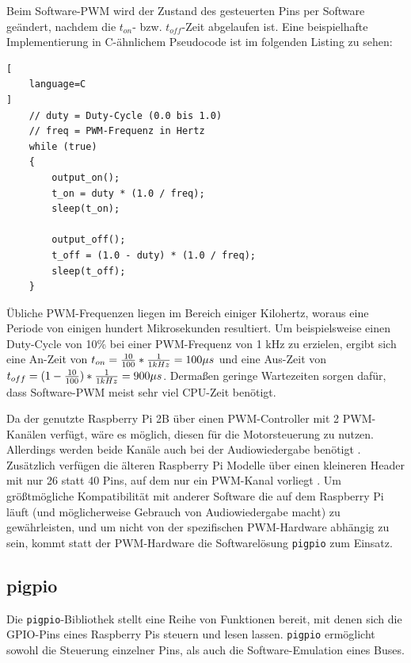 \documentclass[german]{thesis_KBS}
\newcommand{\code}[1]{\texttt{#1}}  %
\begin{document}
Beim Software-PWM wird der Zustand des gesteuerten Pins per Software geändert,
nachdem die $t_{on}$- bzw. $t_{off}$-Zeit abgelaufen ist. Eine beispielhafte
Implementierung in C-ähnlichem Pseudocode ist im folgenden Listing zu sehen:

\begin{minipage}{\linewidth}
\begin{lstlisting}[
    language=C
]
    // duty = Duty-Cycle (0.0 bis 1.0)
    // freq = PWM-Frequenz in Hertz
    while (true)
    {
        output_on();
        t_on = duty * (1.0 / freq);
        sleep(t_on);

        output_off();
        t_off = (1.0 - duty) * (1.0 / freq);
        sleep(t_off);
    }
\end{lstlisting}
\end{minipage}

Übliche PWM-Frequenzen liegen im Bereich einiger Kilohertz, woraus eine Periode
von einigen hundert Mikrosekunden resultiert. Um beispielsweise einen Duty-Cycle
von 10\% bei einer PWM-Frequenz von 1 kHz zu erzielen, ergibt sich eine An-Zeit
von $t_{on} = {10 \over 100} * {1 \over 1 kHz} = 100 \mu s$ und eine Aus-Zeit
von $t_{off} = (1 - {10 \over 100}) * {1 \over 1 kHz} = 900 \mu s$. Dermaßen
geringe Wartezeiten sorgen dafür, dass Software-PWM meist sehr viel CPU-Zeit
benötigt.

Da der genutzte Raspberry Pi 2B über einen PWM-Controller mit 2 PWM-Kanälen
verfügt, wäre es möglich, diesen für die Motorsteuerung zu nutzen. Allerdings
werden beide Kanäle auch bei der Audiowiedergabe benötigt
\cite{pi-audio-uses-pwm}. Zusätzlich verfügen die älteren Raspberry Pi Modelle
über einen kleineren Header mit nur 26 statt 40 Pins, auf dem nur ein PWM-Kanal
vorliegt \cite{pi-gpio-pinout}. Um größtmögliche Kompatibilität mit anderer
Software die auf dem Raspberry Pi läuft (und möglicherweise Gebrauch von
Audiowiedergabe macht) zu gewährleisten, und um nicht von der spezifischen
PWM-Hardware abhängig zu sein, kommt statt der PWM-Hardware die Softwarelösung
\code{pigpio} zum Einsatz.


\subsection{pigpio}

\newcommand{\pigpio}[0]{\code{pigpio}}

Die \pigpio{}-Bibliothek stellt eine Reihe von Funktionen bereit, mit denen sich
die GPIO-Pins eines Raspberry Pis steuern und lesen lassen. \pigpio{} ermöglicht
sowohl die Steuerung einzelner Pins, als auch die Software-Emulation eines
Buses.
\end{document}
